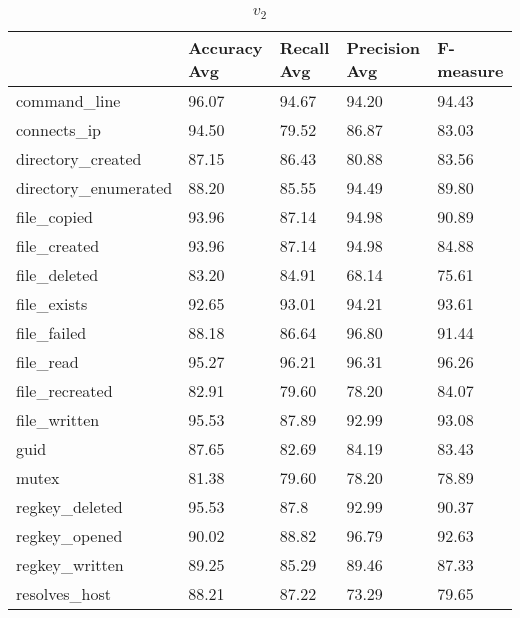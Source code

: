 \documentclass{thesis}
\begin{document}
\begin{table}[H]
	\caption{$v_2$}
	\label{table:v2}
	\begin{center}
		\begin{tabular}{|l||p{24mm}|p{24mm}|p{24mm}|p{24mm}|} \hline
			 & Accuracy Avg & Recall Avg & Precision Avg & F-measure \\ \hline \hline
			command\_line &  96.07&94.67  &94.20 &94.43  \\ \hline
			connects\_ip &94.50&79.52&86.87&83.03  \\ \hline
			directory\_created &87.15&86.43&80.88&83.56  \\ \hline
			directory\_enumerated &88.20&85.55&94.49&89.80 \\ \hline
                  file\_copied  &93.96&87.14&94.98&90.89 \\ \hline
                   file\_created &93.96&87.14&94.98&84.88 \\ \hline
                   file\_deleted &83.20&84.91&68.14&75.61 \\ \hline
                  file\_exists &92.65&93.01&94.21&93.61 \\ \hline
                   file\_failed &88.18&86.64&96.80&91.44 \\ \hline
                  file\_read &95.27&96.21&96.31&96.26 \\ \hline
                  file\_recreated &82.91&79.60&78.20&84.07 \\ \hline
                  file\_written &95.53&87.89&92.99&93.08 \\ \hline
                   guid &87.65&82.69&84.19&83.43 \\ \hline
                  mutex &81.38&79.60&78.20&78.89 \\ \hline
                  regkey\_deleted &95.53&87.8&92.99&90.37 \\ \hline
                  regkey\_opened  &90.02&88.82&96.79&92.63 \\ \hline
                  regkey\_written &89.25&85.29&89.46&87.33 \\ \hline
                   resolves\_host &88.21&87.22&73.29&79.65 \\ \hline
		\end{tabular}
	\end{center}
\end{table}
\end{document}

